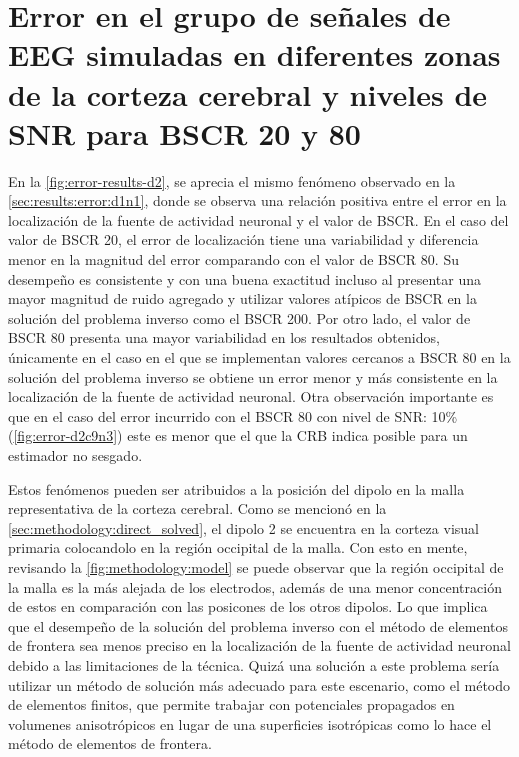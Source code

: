 \section{Error en el grupo de señales de EEG simuladas en
diferentes zonas de la corteza cerebral y niveles de
SNR para BSCR 20 y 80}

En la \cref{fig:error-results-d2}, se aprecia el mismo fenómeno observado en la \cref{sec:results:error:d1n1}, donde se observa una relación positiva entre el error en la localización de la fuente de actividad neuronal y el valor de BSCR.
En el caso del valor de BSCR 20, el error de localización tiene una variabilidad y diferencia menor en la magnitud del error comparando con el valor de BSCR 80.
Su desempeño es consistente y con una buena exactitud incluso al presentar una mayor magnitud de ruido agregado y utilizar valores atípicos de BSCR en la solución del problema inverso como el BSCR 200.
Por otro lado, el valor de BSCR 80 presenta una mayor variabilidad en los resultados obtenidos, únicamente en el caso en el que se implementan valores cercanos a BSCR 80 en la solución del problema inverso se obtiene un error menor y más consistente en la localización de la fuente de actividad neuronal.
Otra observación importante es que en el caso del error incurrido con el BSCR 80 con nivel de SNR: 10\% (\cref{fig:error-d2c9n3}) este es menor que el que la CRB indica posible para un estimador no sesgado.

Estos fenómenos pueden ser atribuidos a la posición del dipolo en la malla representativa de la corteza cerebral. 
Como se mencionó en la \cref{sec:methodology:direct_solved}, el dipolo 2 se encuentra en la corteza visual primaria colocandolo en la región occipital de la malla.
Con esto en mente, revisando la \cref{fig:methodology:model} se puede observar que la región occipital de la malla es la más alejada de los electrodos, además de una menor concentración de estos en comparación con las posicones de los otros dipolos. 
Lo que implica que el desempeño de la solución del problema inverso con el método de elementos de frontera sea menos preciso en la localización de la fuente de actividad neuronal debido a las limitaciones de la técnica.
Quizá una solución a este problema sería utilizar un método de solución más adecuado para este escenario, como el método de elementos finitos, que permite trabajar con potenciales propagados en volumenes anisotrópicos en lugar de una superficies isotrópicas como lo hace el método de elementos de frontera.

